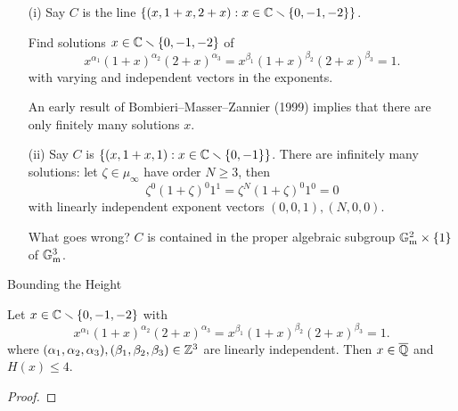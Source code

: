 \documentclass{beamer}
\begin{document}
\begin{frame}
  \begin{example}
    \begin{enumerate}
    \item [(i)]
      Say $C$ is the line $\left\{(x,1+x,2+x) : x\in {\mathbb{C}}\smallsetminus\{0,-1,-2\}\right\}$.
      
      Find solutions  $x\in{\mathbb{C}}\smallsetminus\{0,-1,-2\}$ of 
      \begin{equation*}
        x^{\alpha_1} (1+x)^{\alpha_2} (2+x)^{\alpha_3} =
        x^{\beta_1} (1+x)^{\beta_2} (2+x)^{\beta_3} = 1.
      \end{equation*}
      with \alert{varying} and \alert{independent}  vectors in the
      exponents.

      An early result of Bombieri--Masser--Zannier (1999) implies
      that there are only \alert{finitely} many solutions $x$.

    \item[(ii)] Say $C$ is $\{(x,1+x,1) : x\in {\mathbb{C}}\smallsetminus \{0,-1\}\}$.
      There are \alert{infinitely} many solutions:  let
      $\zeta\in\mu_\infty$ have order $N\ge 3$, then 
      \begin{equation*}
        \zeta^{0} (1+\zeta)^{0} 1^{1} = \zeta^{N} (1+\zeta)^{0} 1^0 = 0
      \end{equation*}
      with linearly independent exponent vectors $(0,0,1),(N,0,0)$.

      What goes wrong? $C$ is contained in the proper algebraic subgroup
      ${\mathbb{G}}_{\mathrm{m}}^2\times \{1\}$ of ${\mathbb{G}}_{\mathrm{m}}^3$. 
    \end{enumerate}
  \end{example}  
\end{frame}

\begin{frame}{Bounding the Height}
  \begin{lemma}
    Let 
    $x\in{\mathbb{C}}\smallsetminus\{0,-1,-2\}$ with
    \begin{equation*}
      x^{\alpha_1} (1+x)^{\alpha_2} (2+x)^{\alpha_3} =
      x^{\beta_1} (1+x)^{\beta_2} (2+x)^{\beta_3} = 1.
    \end{equation*}
    where
    $(\alpha_1,\alpha_2,\alpha_3),(\beta_1,\beta_2,\beta_3)\in{\mathbb{Z}}^3$
    are linearly independent. Then $x\in{\overline{\mathbb{Q}}}$ and $H(x)\le 4$. 
  \end{lemma}
  \begin{proof}\renewcommand{\qedsymbol}{}
    \vspace{2cm}
  \end{proof}  
\end{frame}
\end{document}

